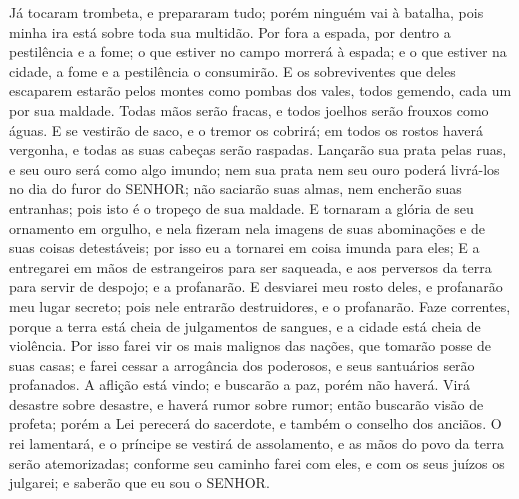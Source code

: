 {  Já tocaram trombeta, e prepararam tudo; porém ninguém vai à batalha, pois minha ira está sobre toda sua multidão.
  Por fora a espada, por dentro a pestilência e a fome; o que estiver no campo morrerá à espada; e o que estiver na cidade, a fome e a pestilência o consumirão.
  E os sobreviventes que deles escaparem
 estarão pelos montes como pombas dos vales, todos gemendo, cada um por sua maldade.
  Todas mãos serão fracas, e todos joelhos serão frouxos como águas.
  E se vestirão de saco, e o tremor os cobrirá; em todos os rostos haverá vergonha, e todas as suas cabeças serão raspadas.
  Lançarão sua prata pelas ruas, e seu ouro será como algo imundo; nem sua prata nem seu ouro poderá livrá-los no dia do furor do SENHOR; não saciarão suas almas, nem encherão suas entranhas; pois isto é o tropeço de sua maldade.
  E tornaram a glória de seu ornamento em orgulho, e nela fizeram nela imagens de suas abominações e de suas coisas detestáveis; por isso eu a tornarei em coisa imunda para eles;
  E a entregarei em mãos de estrangeiros para ser saqueada, e aos perversos da terra para servir de despojo; e a profanarão.
  E desviarei meu rosto deles, e profanarão meu lugar secreto; pois nele entrarão destruidores, e o profanarão.
  Faze correntes,
 porque a terra está cheia de julgamentos de sangues, e a cidade está cheia de violência.
  Por isso farei vir os mais malignos das nações, que tomarão posse de suas casas; e farei cessar a arrogância dos poderosos,
 e seus santuários serão profanados.
  A aflição
 está vindo; e buscarão a paz, porém não haverá.
  Virá desastre sobre desastre, e haverá rumor sobre rumor; então buscarão visão de profeta; porém a Lei perecerá do sacerdote, e também o conselho dos anciãos.
  O rei lamentará, e o príncipe se vestirá de assolamento, e as mãos do povo da terra serão atemorizadas; conforme seu caminho farei com eles, e com os seus juízos os julgarei; e saberão que eu sou o SENHOR.
\par }

